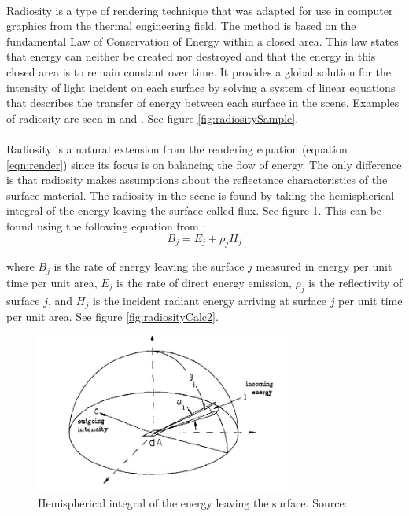 \paragraph{}
Radiosity is a type of rendering technique that was adapted for use in computer graphics from the thermal engineering field.  The method is based on the fundamental Law of Conservation of Energy within a closed area.  This law states that energy can neither be created nor destroyed and that the energy in this closed area is to remain constant over time.  It provides a global solution for the intensity of light incident on each surface by solving a system of linear equations that describes the transfer of energy between each surface in the scene.  Examples of radiosity are seen in \cite{Immel1986} and \cite{Goral1984}.  See figure \ref{fig:radiositySample}.

\paragraph{}
Radiosity is a natural extension from the rendering equation (equation \ref{eqn:render}) since its focus is on balancing the flow of energy.  The only difference is that radiosity makes assumptions about the reflectance characteristics of the surface material.  The radiosity in the scene is found by taking the hemispherical integral of the energy leaving the surface called flux.  See figure \ref{fig:radiosityCalc1}.  This can be found using the following equation from \cite{Goral1984}:
\begin{equation}
B_{j} = E_{j} + \rho_{j}H_{j} \label{eqn:radiosity1}
\end{equation}

where $B_{j}$ is the rate of energy leaving the surface $j$ measured in energy per unit time per unit area, $E_{j}$ is the rate of direct energy emission,  $\rho_{j}$ is the reflectivity of surface $j$, and $H_{j}$ is the incident radiant energy arriving at surface $j$ per unit time per unit area.  See figure \ref{fig:radiosityCalc2}.

\begin{figure}[h!]
  \centering
    \includegraphics[width=0.75\textwidth]{radiosityCalc1.jpg}
  \caption{Hemispherical integral of the energy leaving the surface. Source: \protect\cite{Immel1986}}
	\label{fig:radiosityCalc1}
\end{figure}

